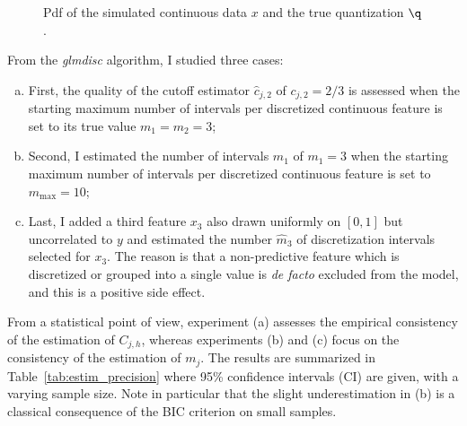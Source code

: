 \begin{figure}
\centering
{}
\caption{\label{fig:exp_sim} Pdf of the simulated continuous data $x$ and the true quantization $\q$.}
\end{figure}


From the \textit{glmdisc} algorithm, I studied three cases:
\begin{enumerate}[(a)]
    \item First, the quality of the cutoff estimator $\hat{c}_{j,2}$ of $c_{j,2} = 2/3$ is assessed when the starting maximum number of intervals per discretized continuous feature is set to its true value $m_1=m_2= 3$;
    \item Second, I estimated the number of intervals $\hat{m}_1$ of $m_1=3$ when the starting maximum number of intervals per discretized continuous feature is set to $m_{\text{max}} = 10$; 
    \item Last, I added a third feature $x_3$ also drawn uniformly on $[0,1]$ but uncorrelated to $y$ and estimated the number $\hat{m}_3$ of discretization intervals selected for $x_3$. The reason is that a non-predictive feature which is discretized or grouped into a single value is \textit{de facto} excluded from the model, and this is a positive side effect.
\end{enumerate}
From a statistical point of view, experiment (a) assesses the empirical consistency of the estimation of $C_{j,h}$, whereas experiments (b) and (c) focus on the consistency of the estimation of $m_j$. The results are summarized in Table~\ref{tab:estim_precision} where 95\% confidence intervals (CI) are given, with a varying sample size. Note in particular that the slight underestimation in (b) is a classical consequence of the BIC criterion on small samples. 

